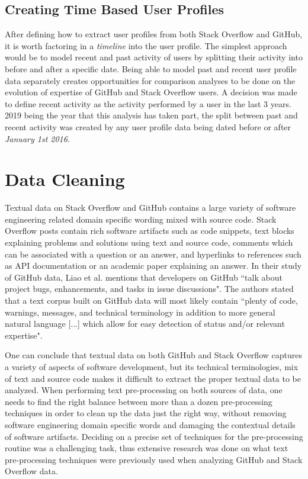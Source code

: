     \subsection{Creating Time Based User Profiles\label{past_recent_full_segm}}
        After defining how to extract user profiles from both Stack Overflow and GitHub, it is worth factoring in a \textit{timeline} into the user profile. The simplest approach would be to model recent and past activity of users by splitting their activity into before and after a specific date. Being able to model past and recent user profile data separately creates opportunities for comparison analyses to be done on the evolution of expertise of GitHub and Stack Overflow users. A decision was made to define recent activity as the activity performed by a user in the last 3 years. 2019 being the year that this analysis has taken part, the split between past and recent activity was created by any user profile data being dated before or after \textit{January 1st 2016}.
        

\section{Data Cleaning}

    Textual data on Stack Overflow and GitHub contains a large variety of software engineering related domain specific wording mixed with source code. Stack Overflow posts contain rich software artifacts such as code snippets, text blocks explaining problems and solutions using text and source code, comments which can be associated with a question or an answer, and hyperlinks to references such as API documentation or an academic paper explaining an answer. In their study of GitHub data, Liao et al. \cite{liao2019status} mentions that developers on GitHub ``talk about project bugs, enhancements, and tasks in issue discussions". The authors stated that a text corpus built on GitHub data will most likely contain ``plenty of code, warnings, messages, and technical terminology in addition to more general natural language [...] which allow for easy detection of status and/or relevant expertise".
    
    One can conclude that textual data on both GitHub and Stack Overflow captures a variety of aspects of software development, but its technical terminologies, mix of text and source code makes it difficult to extract the proper textual data to be analyzed. When performing text pre-processing on both sources of data, one needs to find the right balance between more than a dozen pre-processing techniques in order to clean up the data just the right way, without removing software engineering domain specific words and damaging the contextual details of software artifacts. Deciding on a precise set of techniques for the pre-processing routine was a challenging task, thus extensive research was done on what text pre-processing techniques were previously used when analyzing GitHub and Stack Overflow data.
    
